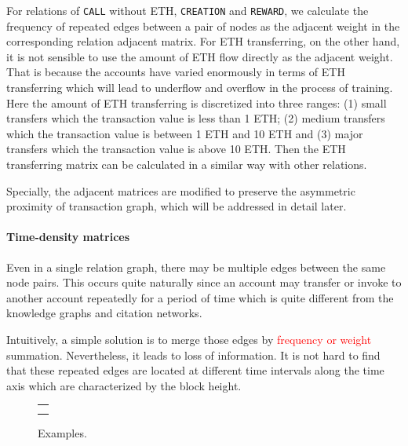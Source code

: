 For relations of \texttt{CALL} without ETH, \texttt{CREATION} and \texttt{REWARD}, we calculate the frequency of repeated edges between a pair of nodes as the adjacent weight in the corresponding relation adjacent matrix. For ETH transferring, on the other hand, it is not sensible to use the amount of ETH flow directly as the adjacent weight. That is because the accounts have varied enormously in terms of ETH transferring which will lead to underflow and overflow in the process of training. Here the amount of ETH transferring is discretized into three ranges: (1) small transfers which the transaction value is less than 1 ETH; (2) medium transfers which the transaction value is between 1 ETH and 10 ETH and (3) major transfers which the transaction value is above 10 ETH. Then the ETH transferring matrix can be calculated in a similar way with other relations.

Specially, the adjacent matrices are modified to preserve the asymmetric proximity of transaction graph, which will be addressed in detail later.

\paragraph{Time-density matrices}
Even in a single relation graph, there may be multiple edges between the same node pairs. This occurs quite naturally since an account may transfer or invoke to another account repeatedly for a period of time which is quite different from the knowledge graphs and citation networks.

Intuitively, a simple solution is to merge those edges by \textcolor{red}{frequency or weight} summation. Nevertheless, it leads to loss of information. It is not hard to find that these repeated edges are located at different time intervals along the time axis which are characterized by the block height.

\begin{figure}[htbp]
\centering
\begin{tabular}{c}
	\subfigure[Time variance histogram of whole nodes.]{
		\label{fig:high_order}
    
	}\\
	\subfigure[Time variance histogram of hack\&phish nodes.]{
		\label{fig:asymmetric}
    
	}
\end{tabular}
\caption{Examples.}
\label{fig:time_std}
\end{figure}

